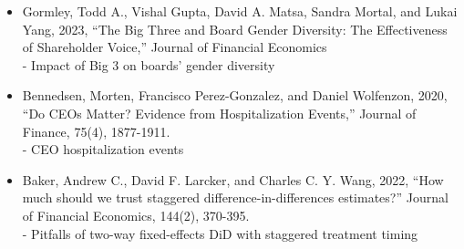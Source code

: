 \documentclass[11pt, a4paper]{article}
\begin{document}
\begin{itemize}
	\item  Gormley, Todd A., Vishal Gupta, David A. Matsa, Sandra Mortal, and Lukai Yang, 2023,
	``The Big Three and Board Gender Diversity: The Effectiveness of Shareholder Voice,''
	Journal of Financial Economics \\
	- Impact of Big 3 on boards' gender diversity

	\item Bennedsen, Morten, Francisco Perez-Gonzalez, and Daniel Wolfenzon, 2020,
	``Do CEOs Matter? Evidence from Hospitalization Events,'' Journal of Finance, 75(4), 1877-1911. \\
	- CEO hospitalization events

	\item Baker, Andrew C., David F. Larcker, and Charles C. Y. Wang, 2022, ``How much should we trust staggered difference-in-differences estimates?'' Journal of Financial Economics, 144(2), 370-395. \\
	- Pitfalls of two-way fixed-effects DiD with staggered treatment timing
\end{itemize}
\end{document}
